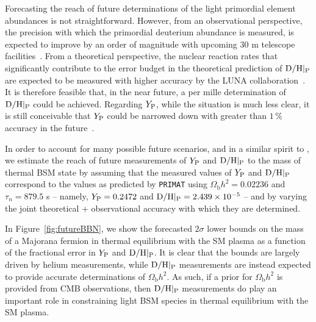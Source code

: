 \documentclass[notitlepage,letterpaper,natbib,aps,prd,onecolumn,amsmath,amsfonts,nofootinbib,preprintnumbers,superscriptaddress,secnumarabic,groupedaddress]{revtex4-1}
\begin{document}
Forecasting the reach of future determinations of the light primordial element abundances is not straightforward. However, from an observational perspective, the precision with which the primordial deuterium abundance is measured, is expected to improve by an order of magnitude with upcoming 30 m telescope facilities~\cite{Cooke:2016rky,Grohs:2019cae}. From a theoretical perspective, the nuclear reaction rates that significantly contribute to the error budget in the theoretical prediction of ${\rm D/H}|_{\rm P}$ are expected to be measured with higher accuracy by the LUNA collaboration~\cite{Trezzi:2018qjs}. It is therefore feasible that, in the near future, a per mille determination of ${\rm D/H}|_{\rm P}$ could be achieved. Regarding $Y_{\rm P}$, while the situation is much less clear, it is still conceivable that $Y_{\rm P}$ could be narrowed down with greater than $1\,\%$ accuracy in the future~\cite{Grohs:2019cae}.

In order to account for many possible future scenarios, and in a similar spirit to \cite{Lague:2019yvs}, we estimate the reach of future measurements of $Y_{\rm P}$ and ${\rm D/H}|_{\rm P}$ to the mass of thermal BSM state by assuming that the measured values of $Y_{\rm P}$ and ${\rm D/H}|_{\rm P}$ correspond to the values as predicted by \texttt{PRIMAT} using $\Omega_\mathrm{b} h^2 = 0.02236$ and $\tau_n = 879.5$ s -- namely, $Y_{\rm P} = 0.2472$ and ${\rm D/H}|_{\rm P} = 2.439 \times 10^{-5}$ -- and by varying the joint theoretical + observational accuracy with which they are determined.

In Figure~\ref{fig:futureBBN}, we show the forecasted $2\sigma$ lower bounds on the mass of a Majorana fermion in thermal equilibrium with the SM plasma as a function of the fractional error in $Y_{\rm P}$ and ${\rm D/H}|_{\rm P}$. It is clear that the bounds are largely driven by helium measurements, while ${\rm D/H}|_{\rm P}$ measurements are instead expected to provide accurate determinations of $\Omega_\mathrm{b}h^2$. As such, if a prior for $\Omega_\mathrm{b}h^2$ is provided from CMB observations, then ${\rm D/H}|_{\rm P}$ measurements do play an important role in constraining light BSM species in thermal equilibrium with the SM plasma. 
 
\end{document}
